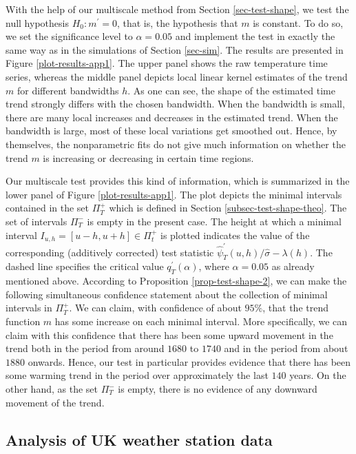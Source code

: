 With the help of our multiscale method from Section \ref{sec-test-shape}, we test the null hypothesis $H_0: m^\prime = 0$, that is, the hypothesis that $m$ is constant. To do so, we set the significance level to $\alpha = 0.05$ and implement the test in exactly the same way as in the simulations of Section \ref{sec-sim}. The results are presented in Figure \ref{plot-results-app1}. The upper panel shows the raw temperature time series, whereas the middle panel depicts local linear kernel estimates of the trend $m$ for different bandwidths $h$. As one can see, the shape of the estimated time trend strongly differs with the chosen bandwidth. When the bandwidth is small, there are many local increases and decreases in the estimated trend. When the bandwidth is large, most of these local variations get smoothed out. Hence, by themselves, the nonparametric fits do not give much information on whether the trend $m$ is increasing or decreasing in certain time regions. 


Our multiscale test provides this kind of information, which is summarized in the lower panel of Figure \ref{plot-results-app1}. The plot depicts the minimal intervals contained in the set $\Pi_T^+$ which is defined in Section \ref{subsec-test-shape-theo}. The set of intervals $\Pi_T^-$ is empty in the present case. The height at which a minimal interval $I_{u,h} = [u-h,u+h] \in \Pi_t^+$ is plotted indicates the value of the corresponding (additively corrected) test statistic $\widehat{\psi}^\prime_T(u,h) / \widehat{\sigma} - \lambda(h)$. The dashed line specifies the critical value $q_T^\prime(\alpha)$, where $\alpha = 0.05$ as already mentioned above. According to Proposition \ref{prop-test-shape-2}, we can make the following simultaneous confidence statement about the collection of minimal intervals in $\Pi_T^+$. We can claim, with confidence of about $95\%$, that the trend function $m$ has some increase on each minimal interval. More specifically, we can claim with this confidence that there has been some upward movement in the trend both in the period from around $1680$ to $1740$ and in the period from about $1880$ onwards. Hence, our test in particular provides evidence that there has been some warming trend in the period over approximately the last $140$ years. On the other hand, as the set $\Pi_T^-$ is empty, there is no evidence of any downward movement of the trend.  


\subsection{Analysis of UK weather station data}\label{subsec-data-2} 


